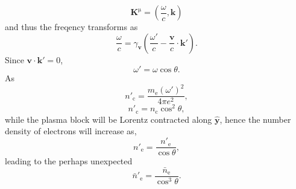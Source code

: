 \begin{equation}
	\mathbf{K}^\mathrm{\mu} = \left(\frac{\omega}{c},\mathbf{k}\right)
\end{equation}
and thus the freqency transforms as
\begin{equation}
	\frac{\omega}{c} = \gamma_\mathbf{v}\left(\frac{\omega'}{c}-\frac{\mathbf{v}}{c}\cdot\mathbf{k'}\right).
\end{equation}
Since $\mathbf{v}\cdot\mathbf{k'} = 0$, 
\begin{equation}\label{eq:boost_omega}
	\omega' = \omega\cos\theta .
\end{equation}
As 
\begin{equation}
	n'_\mathrm{c} = \frac{m_\mathrm{e}(\omega')^2}{4\pi e^2},
\end{equation}
\begin{equation}\label{eq:boost_nc}
	n'_\mathrm{c} =n_\mathrm{c} \cos^2\theta ,
\end{equation}
while the plasma block will be Lorentz contracted along $\hat{\mathbf{y}}$, hence the number density of electrons will increase as,
\begin{equation}
	n'_\mathrm{e} = \frac{n'_\mathrm{e}}{\cos\theta},
\end{equation}
leading to the perhaps unexpected
\begin{equation}
	\bar{n}'_\mathrm{e} = \frac{\bar{n}_\mathrm{e}}{\cos^3\theta}.
\end{equation}


